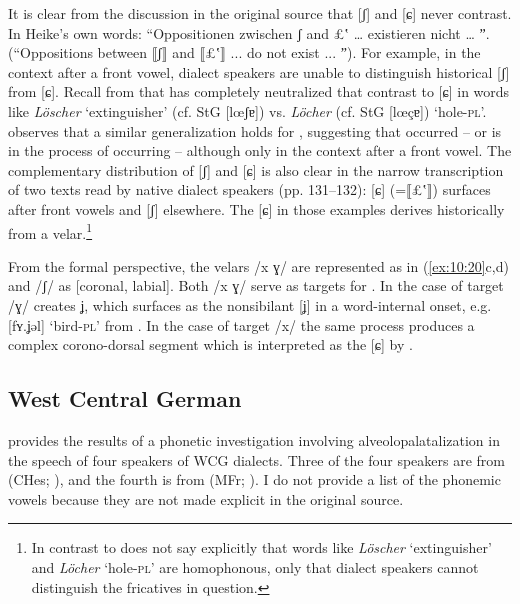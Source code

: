 \begin{xlist}
It is clear from the discussion in the original source that [ʃ] and [ɕ] never contrast. In Heike’s own words: “Oppositionen zwischen ʃ and £ʽ … existieren nicht … ˮ. (“Oppositions between ⟦ʃ⟧ and ⟦£ʽ⟧ ... do not exist ... ˮ). For example, in the context after a front vowel, dialect speakers are unable to distinguish historical [ʃ] from [ɕ]. Recall from  that  has completely neutralized that contrast to [ɕ] in words like \textit{Löscher} ‘extinguisher’ (cf. StG [lœʃɐ]) vs. \textit{Löcher} (cf. StG [lœçɐ]) ‘hole-\textsc{pl}’. \citet[46]{Heike1964} observes that a similar generalization holds for , suggesting that  occurred -- or is in the process of occurring -- although only in the context after a front vowel. The complementary distribution of [ʃ] and [ɕ] is also clear in the narrow transcription of two texts read by native dialect speakers (pp. 131--132): [ɕ] (=⟦£ʽ⟧) surfaces after front vowels and [ʃ] elsewhere. The [ɕ] in those examples derives historically from a velar.\footnote{In contrast to \citet{Große1957, Heike1964} does not say explicitly that words like \textit{Löscher} ‘extinguisher’ and \textit{Löcher} ‘hole-\textsc{pl}’ are homophonous, only that dialect speakers cannot distinguish the fricatives in question.}

From the formal perspective, the velars /x ɣ/ are represented as in (\ref{ex:10:20}c,d) and /ʃ/ as [coronal, labial]. Both /x ɣ/ serve as targets for . In the case of target /ɣ/  creates {\textbar}ʝ{\textbar}, which surfaces as the nonsibilant [ʝ] in a word-internal onset, e.g. [fʏ.ʝǝl] ‘bird-\textsc{pl}’ from . In the case of target /x/ the same process produces a complex corono-dorsal segment which is interpreted as the  [ɕ] by .

\subsection{West Central German}\label{sec:10.4.2}

\citet{Féry2017} provides the results of a phonetic investigation involving alveolopalatalization in the speech of four speakers of WCG dialects. Three of the four speakers are from  (CHes; ), and the fourth is from   (MFr; ). I do not provide a list of the phonemic vowels because they are not made explicit in the original source.


\end{xlist}
